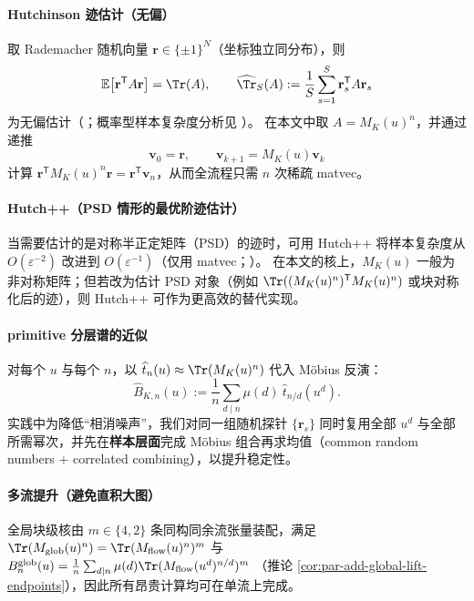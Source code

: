 \paragraph{Hutchinson 迹估计（无偏）}
取 Rademacher 随机向量 $\mathbf r\in\{\pm1\}^N$（坐标独立同分布），则
\[
\mathbb{E}\bigl[\mathbf r^{\mathsf T}A\mathbf r\bigr]=\Tr(A),
\qquad
\widehat{\Tr}_S(A):=\frac{1}{S}\sum_{s=1}^{S}\mathbf r_s^{\mathsf T}A\mathbf r_s
\]
为无偏估计（\cite{Hutchinson1989ASE}；概率型样本复杂度分析见 \cite{AvronToledo2011Trace}）。
在本文中取 $A=M_K(u)^n$，并通过递推
\[
\mathbf v_0=\mathbf r,\qquad \mathbf v_{k+1}=M_K(u)\mathbf v_k
\]
计算 $\mathbf r^{\mathsf T}M_K(u)^n\mathbf r=\mathbf r^{\mathsf T}\mathbf v_n$，从而全流程只需 $n$ 次稀疏 matvec。

\paragraph{Hutch++（PSD 情形的最优阶迹估计）}
当需要估计的是对称半正定矩阵（PSD）的迹时，可用 Hutch++ 将样本复杂度从 $O(\varepsilon^{-2})$ 改进到 $O(\varepsilon^{-1})$（仅用 matvec；\cite{MeyerMuscoMuscoWoodruff2021Hutchpp}）。
在本文的核上，$M_K(u)$ 一般为非对称矩阵；但若改为估计 PSD 对象（例如 $\Tr((M_K(u)^n)^{\mathsf T}M_K(u)^n)$ 或块对称化后的迹），则 Hutch++ 可作为更高效的替代实现。

\paragraph{primitive 分层谱的近似}
对每个 $u$ 与每个 $n$，以 $\widehat t_n(u)\approx \Tr(M_K(u)^n)$ 代入 Möbius 反演：
\[
\widehat B_{K,n}(u):=\frac{1}{n}\sum_{d\mid n}\mu(d)\ \widehat t_{n/d}(u^d).
\]
实践中为降低“相消噪声”，我们对同一组随机探针 $\{\mathbf r_s\}$ 同时复用全部 $u^d$ 与全部所需幂次，并先在\textbf{样本层面}完成 Möbius 组合再求均值（common random numbers + correlated combining），以提升稳定性。

\paragraph{多流提升（避免直积大图）}
全局块级核由 $m\in\{4,2\}$ 条同构同余流张量装配，满足
\(
\Tr(M_{\mathrm{glob}}(u)^n)=\Tr(M_{\mathrm{flow}}(u)^n)^m
\)
与
\(
B_n^{\mathrm{glob}}(u)=\frac1n\sum_{d\mid n}\mu(d)\Tr(M_{\mathrm{flow}}(u^d)^{n/d})^m
\)
（推论 \ref{cor:par-add-global-lift-endpoints}），因此所有昂贵计算均可在单流上完成。


